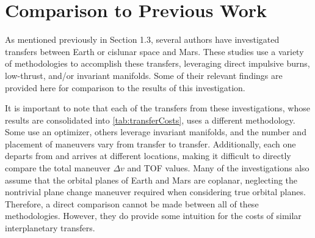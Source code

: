 \section{Comparison to Previous Work}
As mentioned previously in Section 1.3, several authors have investigated transfers between Earth
or cislunar space and Mars. These studies use a variety of methodologies to accomplish these
transfers, leveraging direct impulsive burns, low-thrust, and/or invariant manifolds. Some of their
relevant findings are provided here for comparison to the results of this investigation.

It is important to note that each of the transfers from these investigations, whose results are
consolidated into \cref{tab:transferCosts}, uses a different methodology. Some use an optimizer,
others leverage invariant manifolds, and the number and placement of maneuvers vary from transfer
to transfer. Additionally, each one departs from and arrives at different locations, making it
difficult to directly compare the total maneuver $\Delta v$ and TOF values. Many of the
investigations also assume that the orbital planes of Earth and Mars are coplanar, neglecting the
nontrivial plane change maneuver required when considering true orbital planes. Therefore, a direct
comparison cannot be made between all of these methodologies. However, they do provide some
intuition for the costs of similar interplanetary transfers.


